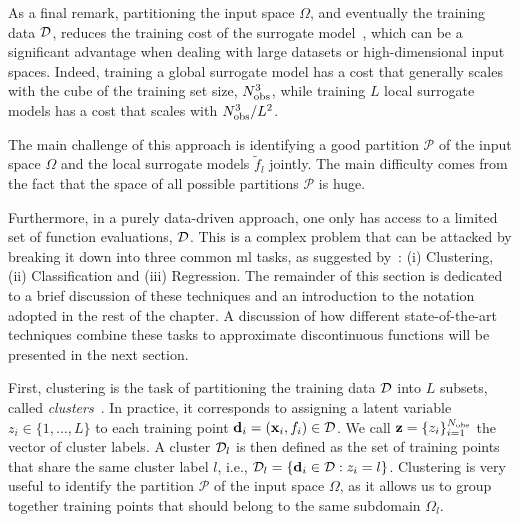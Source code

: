 \smallskip
As a final remark, partitioning the input space $\Omega$, and eventually the training data $\mathcal{D}$, reduces the training cost of the surrogate model~\cite{konomi2019}, which can be a significant advantage when dealing with large datasets or high-dimensional input spaces. Indeed, training a global surrogate model has a cost that generally scales with the cube of the training set size, $N_{\mathrm{obs}}^3$, while training $L$ local surrogate models has a cost that scales with $N_{\mathrm{obs}}^3/L^2$.

\smallskip
The main challenge of this approach is identifying a good partition $\mathcal{P}$ of the input space $\Omega$ and the local surrogate models $\tilde{f}_l$ jointly. The main difficulty comes from the fact that the space of all possible partitions $\mathcal{P}$ is huge.

\smallskip
Furthermore, in a purely data-driven approach, one only has access to a limited set of function evaluations, $\mathcal{D}$. This is a complex problem that can be attacked by breaking it down into three common \gls{ml} tasks, as suggested by~\cite{Sudret2023}: (i) Clustering, (ii) Classification and (iii) Regression. The remainder of this section is dedicated to a brief discussion of these techniques and an introduction to the notation adopted in the rest of the chapter. A discussion of how different state-of-the-art techniques combine these tasks to approximate discontinuous functions will be presented in the next section.

\smallskip
First, clustering is the task of partitioning the training data $\mathcal{D}$ into $L$ subsets, called \textit{clusters}~\cite{stats_pr}. In practice, it corresponds to assigning a latent variable $z_i \in \{1, \ldots, L\}$ to each training point $\mathbf{d}_i = (\mathbf{x}_i, f_i) \in \mathcal{D}$. We call $\mathbf{z} = \{z_i\}_{i=1}^{N_{\mathrm{obs}}}$ the vector of cluster labels. A cluster $\mathcal{D}_l$ is then defined as the set of training points that share the same cluster label $l$, i.e., $\mathcal{D}_l = \{\mathbf{d}_i \in \mathcal{D} : z_i = l\}$. Clustering is very useful to identify the partition $\mathcal{P}$ of the input space $\Omega$, as it allows us to group together training points that should belong to the same subdomain $\Omega_l$.

